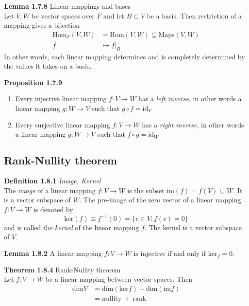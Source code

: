 \documentclass[8pt,landscape]{article}
\begin{document}
\begin{multicols}{3}
    \textbf{Lemma 1.7.8} Linear mappings and bases \\
    Let $V,W$ be vector spaces over $F$ and let $B \subset V$ be a basis.
    Then restriction of a mapping gives a bijection
    \begin{align*}{}
        \text{Hom}_F(V,W) & = \text{Hom}(V,W) \subseteq \text{Maps}(V,W) \\
        f                 & \mapsto f|_B
    \end{align*}
    In other words, each linear mapping determines and is completely determined by the
    values it takes on a basis.

    \textbf{Proposition 1.7.9}
    \begin{enumerate}
        \item Every injective linear mapping $f : V \to W$ has a \emph{left inverse},
            in other words a linear mapping
            $g : W \to V$ such that $g \circ f = \text{id}_V$
        \item Every surjective linear mapping $f: V \to W$ has a \emph{right inverse},
            in other words a linear mapping
            $g : W \to V$ such that $f \circ g = \text{id}_W$
    \end{enumerate}

    \subsection{Rank-Nullity theorem}

    \textbf{Definition 1.8.1} \emph{Image, Kernel} \\
    The \emph{image} of a linear mapping $f : V \to W$ is the subset
    $\text{im}(f) = f(V) \subseteq W$.
    It is a vector subspace of $W$.
    The pre-image of the zero vector of a linear mapping $f : V \to W$ is denoted by
    \[
        \text{ker}(f) \equiv f^{-1}(0) = \{v \in V : f(v) = 0 \}
    \]
    and is called the \emph{kernel} of the linear mapping $f$.
    The kernel is a vector subspace of $V$.

    \textbf{Lemma 1.8.2}
    A linear mapping $f : V \to W$ is injective if and only if $\text{ker}_f = 0$.

    \textbf{Theorem 1.8.4} Rank-Nullity theorem \\
    Let $f : V \to W$ be a linear mapping between vector spaces. Then
    \begin{align*}{}
        \text{dim}V &= \text{dim}(\text{ker}f) + \text{dim}(\text{im}f) \\
                    &= \text{nullity} \ + \ \text{rank}
    \end{align*}


\end{multicols}
\end{document}
